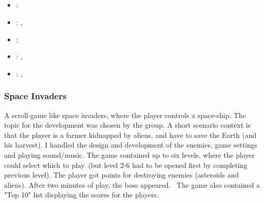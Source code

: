 \subsection[Flash Programming]{}
\label{sec:flash_prog}
\begin{itemize} 
\item {}: 
\item {}: , 
\item {}: 
\item {}: , 
\item {}: , 
\end{itemize} 

\subsubsection{Space Invaders}
\label{sec:space_invaders}
A scroll-game like space invaders, where the player controls a space-ship. 
The topic for the development was chosen by the group. 
A short scenario context is that the player is a farmer kidnapped by aliens, and have to save the Earth (and his harvest).
\vspace{0.5em}\newline
I handled the design and development of the enemies, game settings and playing sound/music. 
The game contained up to six levels, where the player could select which to play (but level 2-6 had to be opened first by completing previous level). 
The player got points for destroying enemies (asteroids and aliens). 
After two minutes of play, the boss appeared. 
The game also contained a "Top 10" list displaying the scores for the players.

